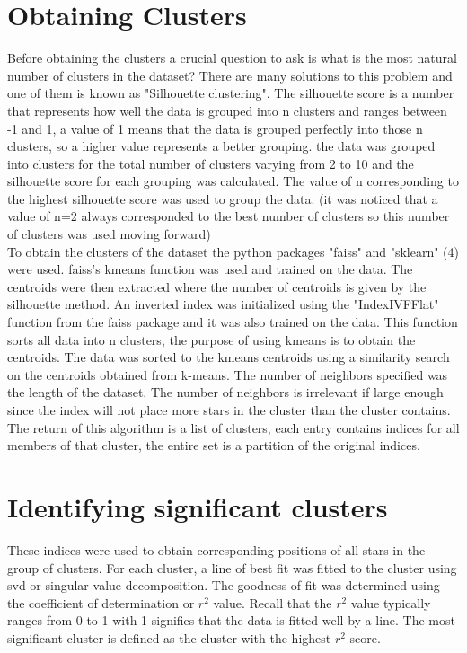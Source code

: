 \documentclass[12pt]{amsart}
\begin{document}
{\section*{Obtaining Clusters}
\indent Before obtaining the clusters a crucial question to ask is what is the most natural number of clusters in the dataset? There are many solutions to this problem and one of them is known as "Silhouette clustering". The silhouette score is a number that represents how well the data is grouped into n clusters and ranges between -1 and 1, a value of 1 means that the data is grouped perfectly into those n clusters, so a higher value represents a better grouping. the data was grouped into clusters for the total number of clusters varying from 2 to 10 and the silhouette score for each grouping was calculated. The value of n corresponding to the highest silhouette score was used to group the data. (it was noticed that a value of n=2 always corresponded to the best number of clusters so this number of clusters was used moving forward)\\

\indent To obtain the clusters of the dataset the python packages "faiss" and "sklearn" (4) were used. faiss's kmeans function was used and trained on the data. The centroids were then extracted where the number of centroids is given by the silhouette method. An inverted index was initialized using the "IndexIVFFlat" function from the faiss package and it was also trained on the data. This function sorts all data into n clusters, the purpose of using kmeans is to obtain the centroids. The data was sorted to the kmeans centroids using a similarity search on the centroids obtained from k-means. The number of neighbors specified was the length of the dataset. The number of neighbors is irrelevant if large enough since the index will not place more stars in the cluster than the cluster contains. The return of this algorithm is a list of clusters, each entry contains indices for all members of that cluster, the entire set is a partition of the original indices.\\

\section*{Identifying significant clusters}
\indent These indices were used to obtain corresponding positions of all stars in the group of clusters. For each cluster, a line of best fit was fitted to the cluster using svd or singular value decomposition. The goodness of fit was determined using the coefficient of determination or $r^2$ value. Recall that the $r^2$ value typically ranges from 0 to 1 with 1 signifies that the data is fitted well by a line. The most significant cluster is defined as the cluster with the highest $r^2$ score.\\

}
\end{document}
